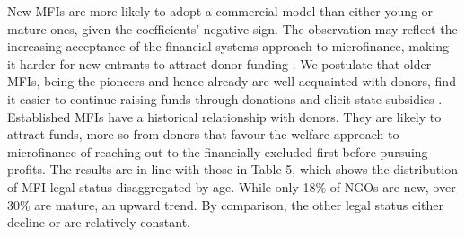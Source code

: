 \documentclass[a4paper,nobind]{templates/ociamthesis}
\newenvironment{Shaded}{\begin{snugshade}}{\end{snugshade}}
\newcommand{\AttributeTok}[1]{\textcolor[rgb]{0.77,0.63,0.00}{#1}}
\newcommand{\ConstantTok}[1]{\textcolor[rgb]{0.00,0.00,0.00}{#1}}
\newcommand{\DecValTok}[1]{\textcolor[rgb]{0.00,0.00,0.81}{#1}}
\newcommand{\FunctionTok}[1]{\textcolor[rgb]{0.00,0.00,0.00}{#1}}
\newcommand{\NormalTok}[1]{#1}
\newcommand{\SpecialCharTok}[1]{\textcolor[rgb]{0.00,0.00,0.00}{#1}}
\newcommand{\StringTok}[1]{\textcolor[rgb]{0.31,0.60,0.02}{#1}}
\renewenvironment{Shaded}
{
  \vspace{10pt}%
  \begin{snugshade}%
}{%
  \end{snugshade}%
  \vspace{8pt}%
}
\begin{document}
New MFIs are more likely to adopt a commercial model than either young or mature ones, given the coefficients' negative sign. The observation may reflect the increasing acceptance of the financial systems approach to microfinance, making it harder for new entrants to attract donor funding \autocite{d2017ngos}. We postulate that older MFIs, being the pioneers and hence already are well-acquainted with donors, find it easier to continue raising funds through donations and elicit state subsidies \autocite{d2013unsubsidized,mia2017mission}. Established MFIs have a historical relationship with donors. They are likely to attract funds, more so from donors that favour the welfare approach to microfinance of reaching out to the financially excluded first before pursuing profits. The results are in line with those in Table 5, which shows the distribution of MFI legal status disaggregated by age. While only 18\% of NGOs are new, over 30\% are mature, an upward trend. By comparison, the other legal status either decline or are relatively constant.

\begin{Shaded}
\end{Shaded}
\end{document}
